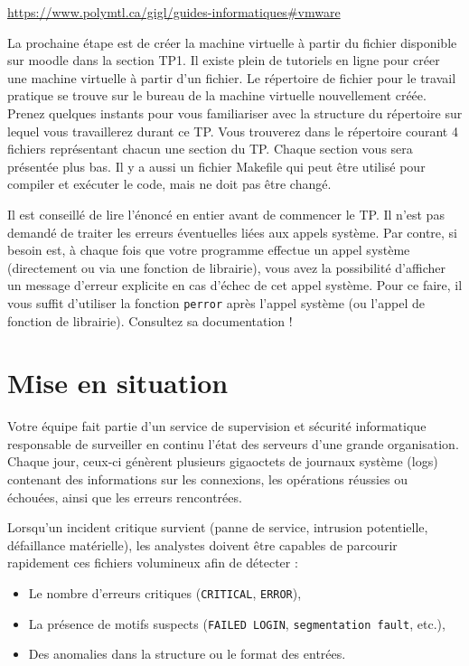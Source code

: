 \documentclass[12pt,addpoints]{exam} %
\begin{document}
\url{https://www.polymtl.ca/gigl/guides-informatiques#vmware}


\vspace{0.5cm}
La prochaine étape est de créer la machine virtuelle à partir du fichier disponible sur moodle dans la section TP1. Il existe plein de tutoriels en ligne pour créer une machine virtuelle à partir d’un fichier. Le répertoire de fichier pour le travail pratique se trouve sur le bureau de la machine virtuelle nouvellement créée. 
\vspace{0.5cm}
Prenez quelques instants pour vous familiariser avec la structure du répertoire sur lequel vous travaillerez durant ce TP. Vous trouverez dans le répertoire courant 4 fichiers représentant chacun une section du TP. Chaque section vous sera présentée plus bas. Il y a aussi un fichier Makefile qui peut être utilisé pour compiler et exécuter le code, mais ne doit pas être changé.



Il est conseillé de lire l’énoncé en entier avant de commencer le TP. Il n’est pas demandé de traiter les erreurs éventuelles liées aux appels système. Par contre, si besoin est, à chaque fois que votre programme effectue un appel système (directement ou via une fonction de librairie), vous avez la possibilité d’afficher un message d’erreur explicite en cas d’échec de cet appel système. Pour ce faire, il vous suffit d’utiliser la fonction \texttt{perror} après l’appel système (ou l’appel de fonction de librairie). Consultez sa documentation !

\vspace{1cm}
\section*{Mise en situation}
Votre équipe fait partie d’un service de supervision et sécurité informatique responsable de surveiller en continu l’état des serveurs d’une grande organisation. Chaque jour, ceux-ci génèrent plusieurs gigaoctets de journaux système (logs) contenant des informations sur les connexions, les opérations réussies ou échouées, ainsi que les erreurs rencontrées.


Lorsqu’un incident critique survient (panne de service, intrusion potentielle, défaillance matérielle), les analystes doivent être capables de parcourir rapidement ces fichiers volumineux afin de détecter :


\begin{itemize}
\item Le nombre d’erreurs critiques (\texttt{CRITICAL}, \texttt{ERROR}),
\item La présence de motifs suspects (\texttt{FAILED LOGIN}, \texttt{segmentation fault}, etc.),
\item Des anomalies dans la structure ou le format des entrées.
\end{itemize}
\end{document}
